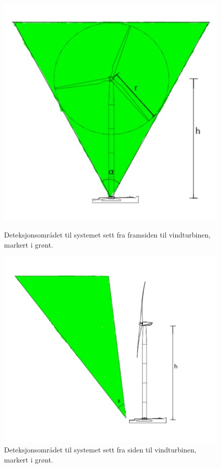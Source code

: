 \begin{figure}[!htbp]%
  \centering
  \begin{minipage}[b]{0.45\textwidth}
    \includegraphics[width=\textwidth]{design/DeteksjonForan.jpg}
    \caption{Deteksjonsområdet til systemet sett fra framsiden til vindturbinen, markert i grønt. }
    \label{fig:TurbinForan}
  \end{minipage}
  \hfill
  \begin{minipage}[b]{0.45\textwidth}
    \includegraphics[width=\textwidth]{design/DeteksjonSiden.jpg}
    \caption{Deteksjonsområdet til systemet sett fra siden til vindturbinen, markert i grønt.}
    \label{fig:TurbinSiden}
  \end{minipage}
\end{figure}

